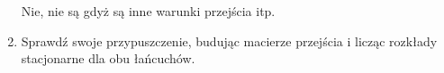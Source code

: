 \documentclass[a4paper,12pt]{article}
\theoremstyle{definition}%
\theoremstyle{definition}
\theoremstyle{problem}
\begin{document}
\begin{enumerate}[label=\alph*)]
\begin{comment}
\path[line] (init) -- (moneta);
\path[line] (moneta) -- (or);
\path[line] (moneta) -- (re);
\path[line] (moneta) -- node [left,near start] {$\sfrac{1}{2}$} (or);
\path[line] (moneta) -- node [right,near start] {$\sfrac{1}{2}$} (re);
\path[line] (or) -- node [left,near start] {$\sfrac{1}{3}$} (or2);
\path[line] (re) -- node [right,near start] {$\sfrac{1}{3}$} (re2);
\path[draw,->,bend left,ultra thick] (re2) node [near start] {tak} (re3);
\path[line] (or2) -- node [near start] {tak} (or3);
\path[line] (re2) -- node [near start] {nie} (init);
\path[line] (or2) -- node [near start] {nie} (init);
\path[line] (or3) -- (init);
\path[line] (re3) -- (init);
\end{tikzpicture}
\end{multicols}
\end{comment}

Nie, nie są gdyż są inne warunki przejścia itp.

\item Sprawdź swoje przypuszczenie, budując macierze przejścia i licząc rozkłady stacjonarne dla obu łańcuchów.


\end{enumerate}
\end{document}
